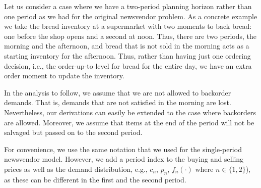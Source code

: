 Let us consider a case where we have a two-period planning horizon rather than one period as we had for the original newsvendor problem. As a concrete example we take the bread inventory at a supermarket with two moments to back bread: one before the shop opens and a second at noon. Thus, there are two periods, the morning and the afternoon, and bread that is not sold in the morning acts as a starting inventory for the afternoon. Thus, rather than having just one ordering decision, i.e., the order-up-to level for bread for the entire day, we have an extra order moment to update the inventory. 


In the analysis to follow, we assume that we are not allowed to backorder demands. That is, demands that are not satisfied in the morning are lost. Nevertheless, our derivations can easily be extended to the case where backorders are allowed.  Moreover, we assume that items at the end of the period will not be salvaged but passed on to the second period.

For convenience, we use the same notation that we used for the single-period newsvendor model. However, we add a period index to the buying and selling prices as well as the demand distribution, e.g.,  $c_n$, $p_{n}$, $f_n(\cdot)$ where $n\in\{1,2\}$), as these can be different in the first and the second period. 

